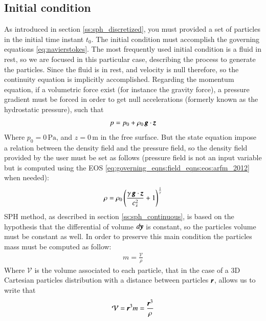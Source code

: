 \subsection{Initial condition}
\label{ss:sph:discrete:initialconditions}
%
As introduced in section \ref{ss:sph_discretized}, you must provided a set of particles in the
initial time instant $t_0$. The initial condition must accomplish the governing equations
\ref{eq:navierstokes}. The most frequently used initial condition is a fluid in rest, so we are
focused in this particular case, describing the process to generate the particles.\rc
%
Since the fluid is in rest, and velocity is null therefore, so the continuity equation is implicitly
accomplished. Regarding the momentum equation, if a volumetric force exist (for instance the gravity
force), a pressure gradient must be forced in order to get null accelerations (formerly known as the
hydrostatic pressure), such that
%
\begin{eqnarray}
p = p_0 + \rho_0 \, \pmb{g} \cdot \pmb{z}
\end{eqnarray}
%
Where $p_0 = 0 \, \mbox{Pa}$, and $z = 0 \, \mbox{m}$ in the free surface. But the state equation impose
a relation between the density field and the pressure field, so the density field provided by the
user must be set as follows (pressure field is not an input variable but is computed using the EOS
\ref{eq:governing_eqns:field_eqns:eos:arfm_2012} when needed):
%
\begin{eqnarray}
\rho = \rho_0 \left( \frac{\gamma \, \pmb{g} \cdot \pmb{z}}{c_s^2} + 1 \right)^{\frac{1}{\gamma}}
\end{eqnarray}
%
SPH method, as described in section \ref{ss:sph_continuous}, is based on the hypothesis that the
differential of volume $d\pmb{y}$ is constant, so the particles volume must be constant as well.
In order to preserve this main condition the particles mass must be computed as follow:
%
\begin{eqnarray}
m = \frac{\mathcal{V}}{\rho}
\end{eqnarray}
%
Where $\mathcal{V}$ is the volume associated to each particle, that in the case of a 3D Cartesian
particles distribution with a distance between particles $\pmb{r}$, allows us to write that
%
\begin{eqnarray}
\mathcal{V} = \pmb{r}^3
m = \frac{\pmb{r}^3}{\rho}
\end{eqnarray}
%
